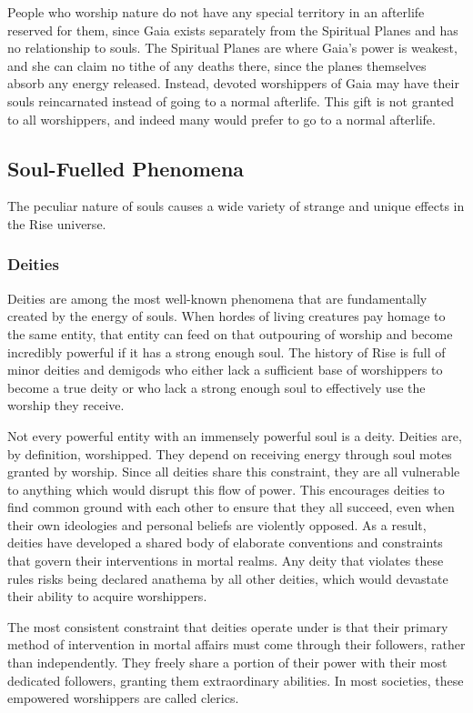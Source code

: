     People who worship nature do not have any special territory in an afterlife reserved for them, since Gaia exists separately from the Spiritual Planes and has no relationship to souls.
    The Spiritual Planes are where Gaia's power is weakest, and she can claim no tithe of any deaths there, since the planes themselves absorb any energy released.
    Instead, devoted worshippers of Gaia may have their souls reincarnated instead of going to a normal afterlife.
    This gift is not granted to all worshippers, and indeed many would prefer to go to a normal afterlife.

  \subsection{Soul-Fuelled Phenomena}

    The peculiar nature of souls causes a wide variety of strange and unique effects in the Rise universe.

    \subsubsection{Deities}
      Deities are among the most well-known phenomena that are fundamentally created by the energy of souls.
      When hordes of living creatures pay homage to the same entity, that entity can feed on that outpouring of worship and become incredibly powerful if it has a strong enough soul.
      The history of Rise is full of minor deities and demigods who either lack a sufficient base of worshippers to become a true deity or who lack a strong enough soul to effectively use the worship they receive.

      Not every powerful entity with an immensely powerful soul is a deity.
      Deities are, by definition, worshipped.
      They depend on receiving energy through soul motes granted by worship.
      Since all deities share this constraint, they are all vulnerable to anything which would disrupt this flow of power.
      This encourages deities to find common ground with each other to ensure that they all succeed, even when their own ideologies and personal beliefs are violently opposed.
      As a result, deities have developed a shared body of elaborate conventions and constraints that govern their interventions in mortal realms.
      Any deity that violates these rules risks being declared anathema by all other deities, which would devastate their ability to acquire worshippers.

      The most consistent constraint that deities operate under is that their primary method of intervention in mortal affairs must come through their followers, rather than independently.
      They freely share a portion of their power with their most dedicated followers, granting them extraordinary abilities.
      In most societies, these empowered worshippers are called clerics.

